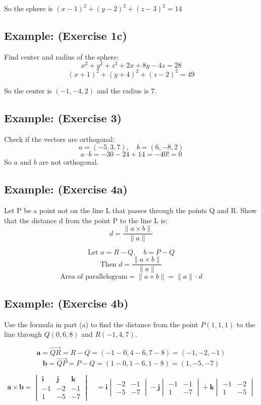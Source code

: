 \documentclass[11pt]{article}
\begin{document}
So the sphere is $(x-1)^2 + (y-2)^2 + (z-3)^2 = 14$

\subsection*{Example: (Exercise 1c)}
Find center and radius of the sphere:
\[
x^2 + y^2 + z^2 + 2x + 8y - 4z = 28
\]
\[
(x+1)^2 + (y+4)^2 + (z-2)^2 = 49
\]

So the center is $(-1,-4,2)$ and the radius is $7$.

\subsection*{Example: (Exercise 3)}
Check if the vectors are orthogonal:
\[
a = (-5,3,7), \quad b = (6,-8,2)
\]
\[
a \cdot b = -30 - 24 + 14 = -40 != 0
\]
So $a$ and $b$ are not orthogonal.

\subsection*{Example: (Exercise 4a)}
Let P be a point not on the line L that passes through the points Q and R. Show that the
distance d from the point P to the line L is:
\[
d = \frac{\|a \times b\|}{\|a\|}
\]

\[
\text{Let } a = R - Q, \quad b =  P - Q
\]
\[
\text{Then } d = \frac{\|a \times b\|}{\|a\|}
\]
\[
\text{Area of parallelogram} = \|a \times b\| = \|a\| \cdot d
\]

\subsection*{Example: (Exercise 4b)}
Use the formula in part (a) to find the distance from the point $P(1, 1, 1)$ to the line through $Q(0, 6, 8)$ and $R(-1, 4, 7)$.

\[
\mathbf{a} = \overrightarrow{QR} = R - Q = (-1 - 0, 4 - 6, 7 - 8) = (-1, -2, -1)
\]
\[
\mathbf{b} = \overrightarrow{QP} = P - Q = (1 - 0, 1 - 6, 1 - 8) = (1, -5, -7)
\]

\[
\mathbf{a} \times \mathbf{b} =
\begin{vmatrix}
\mathbf{i} & \mathbf{j} & \mathbf{k} \\
-1 & -2 & -1 \\
1 & -5 & -7
\end{vmatrix}
\quad
= \mathbf{i} \begin{vmatrix} -2 & -1 \\ -5 & -7 \end{vmatrix}
- \mathbf{j} \begin{vmatrix} -1 & -1 \\ 1 & -7 \end{vmatrix}
+ \mathbf{k} \begin{vmatrix} -1 & -2 \\ 1 & -5 \end{vmatrix}
\]
\end{document}
